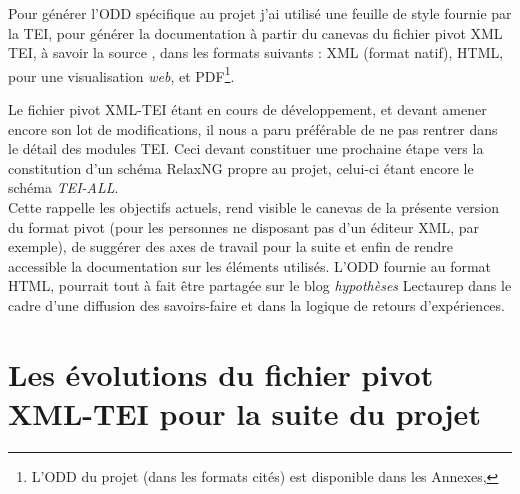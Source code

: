 Pour générer l'ODD spécifique au projet j'ai utilisé une feuille de style  fournie par la TEI, pour générer la documentation à partir du canevas du fichier pivot XML TEI, à savoir la source , dans les formats suivants : XML (format natif), HTML, pour une visualisation \textit{web}, et PDF\footnote{L'ODD du projet (dans les formats cités) est disponible dans les Annexes, }.

Le fichier pivot XML-TEI étant en cours de développement, et devant amener encore son lot de modifications, il nous a paru préférable de ne pas rentrer dans le détail des modules TEI. Ceci devant constituer une prochaine étape vers la constitution d'un schéma RelaxNG propre au projet, celui-ci étant encore le schéma \textit{TEI-ALL}.\\ 

Cette  rappelle les objectifs actuels, rend visible le canevas de la présente version du format pivot (pour les personnes ne disposant pas d'un éditeur XML, par exemple), de suggérer des axes de travail pour la suite et enfin de rendre accessible la documentation sur les éléments utilisés. L'ODD fournie au format HTML, pourrait tout à fait être partagée sur le blog \textit{hypothèses} Lectaurep dans le cadre d'une diffusion des savoirs-faire et dans la logique de retours d'expériences.

\section{Les évolutions du fichier pivot XML-TEI pour la suite du projet}

